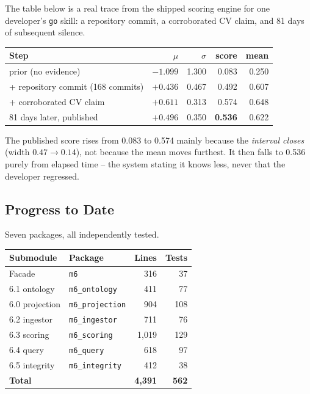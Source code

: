 \documentclass[11pt,a4paper]{article}
\begin{document}
The table below is a real trace from the shipped scoring engine for one
developer's \texttt{go} skill: a repository commit, a corroborated CV claim,
and 81 days of subsequent silence.

\begin{center}\small
\begin{tabular}{@{}L{3.6cm}rrrr@{}}
\toprule
\textbf{Step} & $\mu$ & $\sigma$ & \textbf{score} & \textbf{mean} \\
\midrule
prior (no evidence) & $-1.099$ & 1.300 & 0.083 & 0.250 \\
+ repository commit (168 commits) & $+0.436$ & 0.467 & 0.492 & 0.607 \\
+ corroborated CV claim & $+0.611$ & 0.313 & 0.574 & 0.648 \\
81 days later, published & $+0.496$ & 0.350 & \textbf{0.536} & 0.622 \\
\bottomrule
\end{tabular}
\end{center}

The published score rises from 0.083 to 0.574 mainly because the
\emph{interval closes} (width $0.47\to0.14$), not because the mean moves
furthest. It then falls to 0.536 purely from elapsed time -- the system
stating it knows less, never that the developer regressed.

\subsection{Progress to Date}

Seven packages, all independently tested.

\begin{center}\small
\begin{tabular}{@{}llrr@{}}
\toprule
\textbf{Sub\-module} & \textbf{Package} & \textbf{Lines} & \textbf{Tests} \\
\midrule
Facade & \texttt{m6} & 316 & 37 \\
6.1 ontology & \texttt{m6\_ontology} & 411 & 77 \\
6.0 projection & \texttt{m6\_projection} & 904 & 108 \\
6.2 ingestor & \texttt{m6\_ingestor} & 711 & 76 \\
6.3 scoring & \texttt{m6\_scoring} & 1{,}019 & 129 \\
6.4 query & \texttt{m6\_query} & 618 & 97 \\
6.5 integrity & \texttt{m6\_integrity} & 412 & 38 \\
\midrule
\textbf{Total} & & \textbf{4{,}391} & \textbf{562} \\
\bottomrule
\end{tabular}
\end{center}
\end{document}
